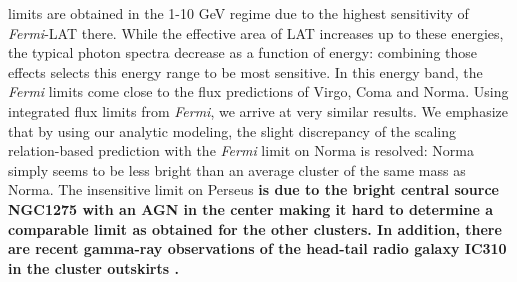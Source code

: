 \documentclass[10pt,aps,pra,reprint,amsmath,amsfonts,amssymb,showpacs,nofootinbib,floatfix]{revtex4-1}
\def\C#1{{\bf #1}}
\newcommand{\Fermi}{{\em Fermi}\xspace}
\begin{document}
limits are obtained in the 1-10 GeV regime due to the highest
sensitivity of \Fermi-LAT there. While the effective area of LAT
increases up to these energies, the typical photon spectra decrease as
a function of energy: combining those effects selects this energy
range to be most sensitive.  In this energy band, the \Fermi limits
come close to the flux predictions of Virgo, Coma and Norma. Using
integrated flux limits from \Fermi, we arrive at very similar results.
We emphasize that by using our analytic modeling, the slight
discrepancy of the scaling relation-based prediction with the \Fermi
limit on Norma \cite{2010ApJ...717L..71A} is resolved: Norma simply
seems to be less bright than an average cluster of the same mass as
Norma. The insensitive limit on Perseus \C{is due to the bright
  central source NGC1275 with an AGN in the center
  \cite{2010ATel.2916....1M} making it hard to determine a comparable
  limit as obtained for the other clusters. In addition, there are
  recent gamma-ray observations of the head-tail radio galaxy IC310 in
  the cluster outskirts
  \cite{2010ApJ...723L.207A,2010A&A...519L...6N}.}
\end{document}
